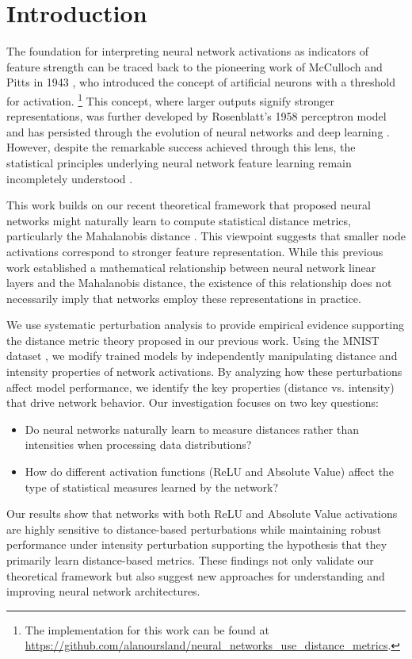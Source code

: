 \section{Introduction}

The foundation for interpreting neural network activations as indicators of feature strength can be traced back to the pioneering work of McCulloch and Pitts in 1943 \citep{mcculloch1943logical}, who introduced the concept of artificial neurons with a threshold for activation. \footnote{The implementation for this work can be found at \url{https://github.com/alanoursland/neural_networks_use_distance_metrics}.} This concept, where larger outputs signify stronger representations, was further developed by Rosenblatt's 1958 perceptron model \citep{rosenblatt1958perceptron} and has persisted through the evolution of neural networks and deep learning \citep{schmidhuber2015deep}. However, despite the remarkable success achieved through this lens, the statistical principles underlying neural network feature learning remain incompletely understood \citep{lipton2018mythos}. 

This work builds on our recent theoretical framework \citep{oursland2024interpreting} that proposed neural networks might naturally learn to compute statistical distance metrics, particularly the Mahalanobis distance \citep{mahalanobis1936generalized}. This viewpoint suggests that smaller node activations correspond to stronger feature representation. While this previous work established a mathematical relationship between neural network linear layers and the Mahalanobis distance, the existence of this relationship does not necessarily imply that networks employ these representations in practice. 

We use systematic perturbation analysis \citep{szegedy2013intriguing, goodfellow2014explaining} to provide empirical evidence supporting the distance metric theory proposed in our previous work. Using the MNIST dataset \citep{lecun1998gradient}, we modify trained models by independently manipulating distance and intensity properties of network activations. By analyzing how these perturbations affect model performance, we identify the key properties (distance vs. intensity) that drive network behavior. Our investigation focuses on two key questions:

\begin{itemize}
    \item Do neural networks naturally learn to measure distances rather than intensities when processing data distributions?
    \item How do different activation functions (ReLU and Absolute Value) affect the type of statistical measures learned by the network?
\end{itemize}

Our results show that networks with both ReLU and Absolute Value activations are highly sensitive to distance-based perturbations while maintaining robust performance under intensity perturbation supporting the hypothesis that they primarily learn distance-based metrics. These findings not only validate our theoretical framework but also suggest new approaches for understanding and improving neural network architectures.